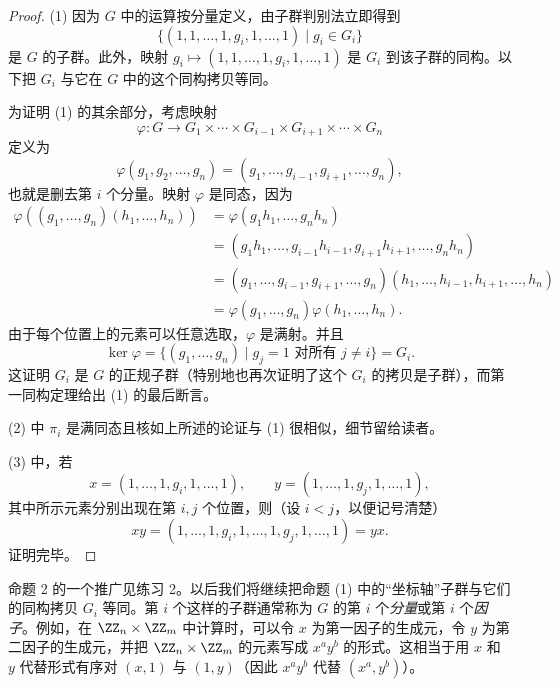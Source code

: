 \begin{proof}
(1) 因为 $G$ 中的运算按分量定义，由子群判别法立即得到
\[
\{(1,1,\ldots,1,g_i,1,\ldots,1)\mid g_i\in G_i\}
\]
是 $G$ 的子群。此外，映射 $g_i\mapsto (1,1,\ldots,1,g_i,1,\ldots,1)$ 是 $G_i$ 到该子群的同构。以下把 $G_i$ 与它在 $G$ 中的这个同构拷贝等同。

为证明 (1) 的其余部分，考虑映射
\[
  \varphi:G\to G_1\times\cdots\times G_{i-1}\times G_{i+1}\times\cdots\times G_n
\]
定义为
\[
  \varphi(g_1,g_2,\ldots,g_n)=(g_1,\ldots,g_{i-1},g_{i+1},\ldots,g_n),
\]
也就是删去第 $i$ 个分量。映射 $\varphi$ 是同态，因为
\begin{align*}
\varphi((g_1,
\ldots,g_n)(h_1,\ldots,h_n))
&=\varphi(g_1h_1,\ldots,g_nh_n)\\
&=(g_1h_1,\ldots,g_{i-1}h_{i-1},g_{i+1}h_{i+1},\ldots,g_nh_n)\\
&=(g_1,\ldots,g_{i-1},g_{i+1},\ldots,g_n)(h_1,\ldots,h_{i-1},h_{i+1},\ldots,h_n)\\
&=\varphi(g_1,
\ldots,g_n)\varphi(h_1,
\ldots,h_n).
\end{align*}
由于每个位置上的元素可以任意选取，$\varphi$ 是满射。并且
\[
  \ker\varphi=\{(g_1,
\ldots,g_n)
\mid g_j=1\text{ 对所有 }j\neq i\}=G_i.
\]
这证明 $G_i$ 是 $G$ 的正规子群（特别地也再次证明了这个 $G_i$ 的拷贝是子群），而第一同构定理给出 (1) 的最后断言。

(2) 中 $\pi_i$ 是满同态且核如上所述的论证与 (1) 很相似，细节留给读者。

(3) 中，若
\[
  x=(1,
\ldots,1,g_i,1,
\ldots,1),
  \qquad
  y=(1,
\ldots,1,g_j,1,
\ldots,1),
\]
其中所示元素分别出现在第 $i,j$ 个位置，则（设 $i<j$，以便记号清楚）
\[
  xy=(1,
\ldots,1,g_i,1,
\ldots,1,g_j,1,
\ldots,1)=yx.
\]
证明完毕。
\end{proof}

命题 2 的一个推广见练习 2。以后我们将继续把命题 (1) 中的“坐标轴”子群与它们的同构拷贝 $G_i$ 等同。第 $i$ 个这样的子群通常称为 $G$ 的第 $i$ 个\emph{分量}或第 $i$ 个\emph{因子}。例如，在 $\ZZ_n\times\ZZ_m$ 中计算时，可以令 $x$ 为第一因子的生成元，令 $y$ 为第二因子的生成元，并把 $\ZZ_n\times\ZZ_m$ 的元素写成 $x^ay^b$ 的形式。这相当于用 $x$ 和 $y$ 代替形式有序对 $(x,1)$ 与 $(1,y)$（因此 $x^ay^b$ 代替 $(x^a,y^b)$）。

